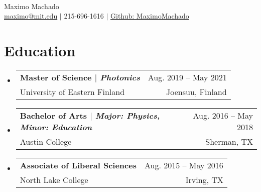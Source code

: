 \documentclass[letterpaper,11pt]{article} %
\makeatletter
\newcommand{\CVSubheading}[4]{
  \vspace{-2pt}\item
    \begin{tabular*}{0.97\textwidth}[t]{l@{\extracolsep{\fill}}r}
      \textbf{#1} & #2 \\
      \small#3 & \small #4 \\
    \end{tabular*}\vspace{-7pt}
}
\newcommand{\CVSubHeadingListStart}{\begin{itemize}[leftmargin=0.5cm, label={}]}
\newcommand{\CVSubHeadingListEnd}{\end{itemize}}
\makeatother
\begin{document}
\begin{comment}
In Europe it is common to include a picture of ones self in the CV. Select
which heading appropriate for the document you are creating.
\end{comment}

\begin{minipage}[c]{0.05\textwidth}
  \-\
\end{minipage}

\begin{center}
  \Huge Maximo Machado \\ \vspace{1pt} %
  \small
  \href{mailto:maximo@mit.edu}{maximo@mit.edu} $|$
  215-696-1616 $|$
  \href{https://github.com/MaximoMachado}{Github: MaximoMachado}
\end{center}

\begin{comment}
This CV was written for specifically for positions I was applying for in
academia, and then modified to be a template.

A standard CV is about two pages long where as a resume in the US is one page.
sections can be added and removed here with this in mind. In my experience,
education, and applicable work experience and skills are the most import things
to include on a resume. For a CV the Europass CV suggests the categories: Work
Experience, Education and Training, Language Skills, Digital Skills,
Communication and Interpersonal Skills, Conferences and Seminars, Creative Works
Driver's License, Hobbies and Interests, Honors and Awards, Management and
Leadership Skills, Networks and Memberships, Organizational Skills, Projects,
Publications, Recommendations, Social and Political Activities, Volunteering.

Your goal is to convey a who, what , when, where, why for every item you share.
The who is obviously you, but I believe the rest should be done in that order.
For example below. An employer cares most about the degree held and typically
less about the institution or where it is located (This is still good
information though). Whatever order you choose be consistent throughout.
\end{comment}

\section{Education}
\CVSubHeadingListStart
\CVSubheading
{{Master of Science $|$ \emph{\small{Photonics}}}}{Aug. 2019 -- May 2021}
{University of Eastern Finland}{Joensuu, Finland}
\CVSubheading
{{Bachelor of Arts $|$ \emph{\small{Major: Physics, Minor: Education}}}}{Aug. 2016 -- May 2018}
{Austin College}{Sherman, TX}
\CVSubheading
{Associate of Liberal Sciences}{Aug. 2015 -- May 2016}
{North Lake College}{Irving, TX}
\CVSubHeadingListEnd
\end{document}
